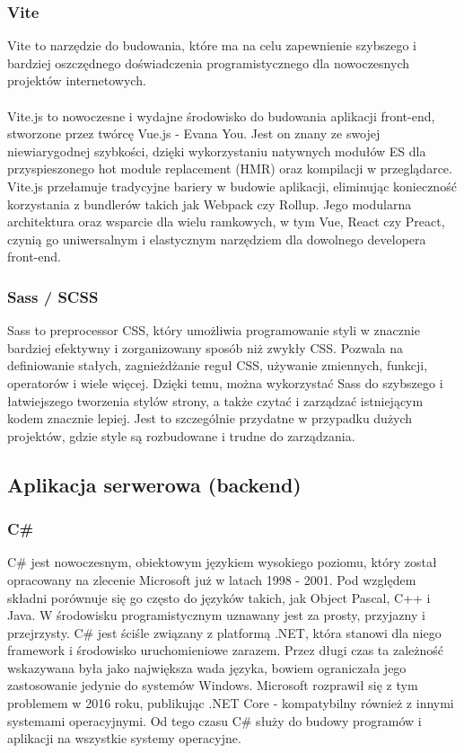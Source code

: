 \documentclass[12pt,a4paper]{article}
\begin{document}
\subsubsection{Vite}
Vite to narzędzie do budowania, które ma na celu zapewnienie szybszego i bardziej oszczędnego doświadczenia programistycznego dla nowoczesnych projektów internetowych.
\\\\
Vite.js to nowoczesne i wydajne środowisko do budowania aplikacji front-end, stworzone przez twórcę Vue.js - Evana You. Jest on znany ze swojej niewiarygodnej szybkości, dzięki wykorzystaniu natywnych modułów ES dla przyspieszonego hot module replacement (HMR) oraz kompilacji w przeglądarce. Vite.js przełamuje tradycyjne bariery w budowie aplikacji, eliminując konieczność korzystania z bundlerów takich jak Webpack czy Rollup. Jego modularna architektura oraz wsparcie dla wielu ramkowych, w tym Vue, React czy Preact, czynią go uniwersalnym i elastycznym narzędziem dla dowolnego developera front-end.

\subsubsection{Sass / SCSS}
Sass to preprocessor CSS, który umożliwia programowanie styli w znacznie bardziej efektywny i zorganizowany sposób niż zwykły CSS. Pozwala na definiowanie stałych, zagnieżdżanie reguł CSS, używanie zmiennych, funkcji, operatorów i wiele więcej. Dzięki temu, można wykorzystać Sass do szybszego i łatwiejszego tworzenia stylów strony, a także czytać i zarządzać istniejącym kodem znacznie lepiej. Jest to szczególnie przydatne w przypadku dużych projektów, gdzie style są rozbudowane i trudne do zarządzania.

\subsection{Aplikacja serwerowa (backend)}
\subsubsection{C\#}
C\# jest nowoczesnym, obiektowym językiem wysokiego poziomu, który został opracowany na zlecenie Microsoft już w latach 1998 - 2001. Pod względem składni porównuje się go często do języków takich, jak Object Pascal, C++ i Java. W środowisku programistycznym uznawany jest za prosty, przyjazny i przejrzysty. C\# jest ściśle związany z platformą .NET, która stanowi dla niego framework i środowisko uruchomieniowe zarazem. Przez długi czas ta zależność wskazywana była jako największa wada języka, bowiem ograniczała jego zastosowanie jedynie do systemów Windows. Microsoft rozprawił się z tym problemem w 2016 roku, publikując .NET Core - kompatybilny również z innymi systemami operacyjnymi. Od tego czasu C\# służy do budowy programów i aplikacji na wszystkie systemy operacyjne.
\end{document}
